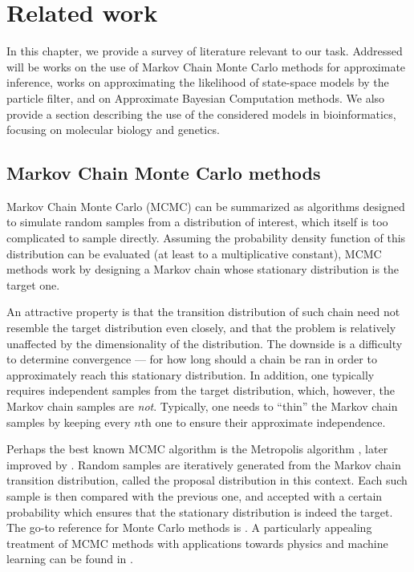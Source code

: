 \chapter{Related work}
\label{chap:related-work}

In this chapter, we provide a survey of literature relevant to our task. Addressed will be works on the use of Markov Chain Monte Carlo methods for approximate inference, works on approximating the likelihood of state-space models by the particle filter, and on Approximate Bayesian Computation methods. We also provide a section describing the use of the considered models in bioinformatics, focusing on molecular biology and genetics.

\section{Markov Chain Monte Carlo methods}
Markov Chain Monte Carlo (MCMC) can be summarized as algorithms designed to simulate random samples from a distribution of interest, which itself is too complicated to sample directly. Assuming the probability density function of this distribution can be evaluated (at least to a multiplicative constant), MCMC methods work by designing a Markov chain whose stationary distribution is the target one.

An attractive property is that the transition distribution of such chain need not resemble the target distribution even closely, and that the problem is relatively unaffected by the dimensionality of the distribution. The downside is a difficulty to determine convergence --- for how long should a chain be ran in order to approximately reach this stationary distribution. In addition, one typically requires independent samples from the target distribution, which, however, the Markov chain samples are \emph{not}. Typically, one needs to ``thin'' the Markov chain samples by keeping every $n$th one to ensure their approximate independence.

Perhaps the best known MCMC algorithm is the Metropolis algorithm \citep{metropolis}, later improved by \cite{hastings}. Random samples are iteratively generated from the Markov chain transition distribution, called the proposal distribution in this context. Each such sample is then compared with the previous one, and accepted with a certain probability which ensures that the stationary distribution is indeed the target. The go-to reference for Monte Carlo methods is \cite{robert-casella}. A particularly appealing treatment of MCMC methods with applications towards physics and machine learning can be found in \cite{information-theory}.


